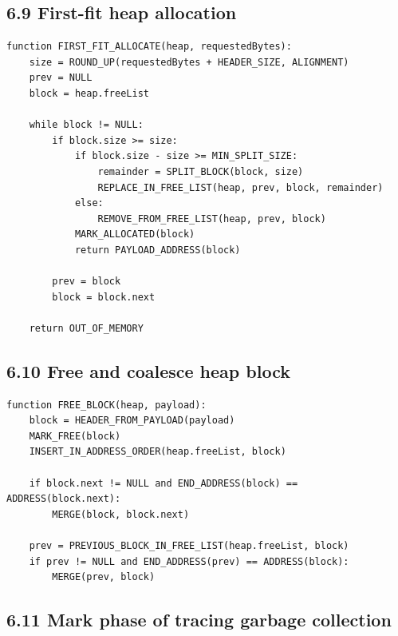 \documentclass[10pt,letterpaper]{article}
\begin{document}
\subsection*{6.9 First-fit heap allocation}
{}

\begin{verbatim}
function FIRST_FIT_ALLOCATE(heap, requestedBytes):
    size = ROUND_UP(requestedBytes + HEADER_SIZE, ALIGNMENT)
    prev = NULL
    block = heap.freeList

    while block != NULL:
        if block.size >= size:
            if block.size - size >= MIN_SPLIT_SIZE:
                remainder = SPLIT_BLOCK(block, size)
                REPLACE_IN_FREE_LIST(heap, prev, block, remainder)
            else:
                REMOVE_FROM_FREE_LIST(heap, prev, block)
            MARK_ALLOCATED(block)
            return PAYLOAD_ADDRESS(block)

        prev = block
        block = block.next

    return OUT_OF_MEMORY
\end{verbatim}

\subsection*{6.10 Free and coalesce heap block}
{}

\begin{verbatim}
function FREE_BLOCK(heap, payload):
    block = HEADER_FROM_PAYLOAD(payload)
    MARK_FREE(block)
    INSERT_IN_ADDRESS_ORDER(heap.freeList, block)

    if block.next != NULL and END_ADDRESS(block) == ADDRESS(block.next):
        MERGE(block, block.next)

    prev = PREVIOUS_BLOCK_IN_FREE_LIST(heap.freeList, block)
    if prev != NULL and END_ADDRESS(prev) == ADDRESS(block):
        MERGE(prev, block)
\end{verbatim}

\subsection*{6.11 Mark phase of tracing garbage collection}
{}
\end{document}
